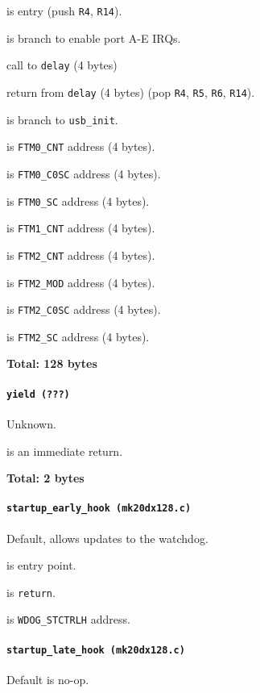  is entry (push \texttt{R4}, \texttt{R14}).

 is branch to enable port A-E IRQs.

 call to \texttt{delay} (4 bytes)

 return from \texttt{delay} (4 bytes) (pop \texttt{R4},
\texttt{R5}, \texttt{R6}, \texttt{R14}).

 is branch to \texttt{usb\_init}.

\vspace{1em}

 is \texttt{FTM0\_CNT} address (4 bytes).

 is \texttt{FTM0\_C0SC} address (4 bytes).

 is \texttt{FTM0\_SC} address (4 bytes).

 is \texttt{FTM1\_CNT} address (4 bytes).

 is \texttt{FTM2\_CNT} address (4 bytes).

 is \texttt{FTM2\_MOD} address (4 bytes).

 is \texttt{FTM2\_C0SC} address (4 bytes).

 is \texttt{FTM2\_SC} address (4 bytes).

\textbf{Total: 128 bytes}

\paragraph{\texttt{yield (???)}} Unknown.

 is an immediate return.

\textbf{Total: 2 bytes}

\paragraph{\texttt{startup\_early\_hook (mk20dx128.c)}} Default, allows updates
to the watchdog.

 is entry point.

 is \texttt{return}.

 is \texttt{WDOG\_STCTRLH} address.

\paragraph{\texttt{startup\_late\_hook (mk20dx128.c)}} Default is no-op.

